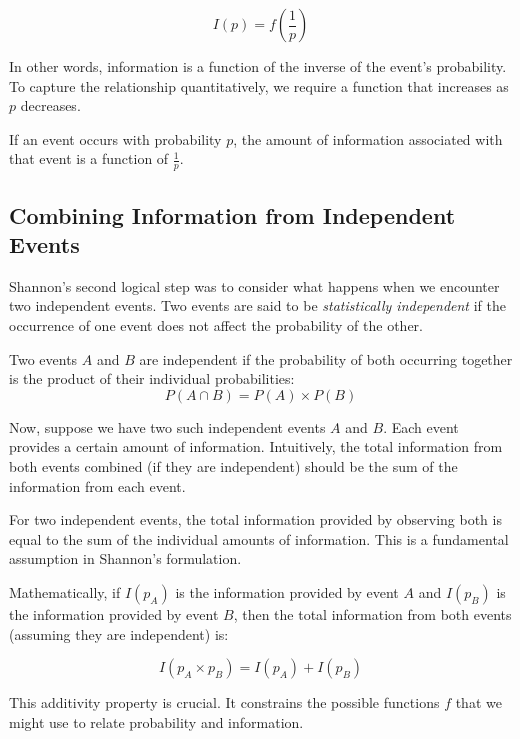 \documentclass[12pt,a4paper]{article}
\newenvironment{defbox}[1][]{%
  \begin{tcolorbox}[enhanced, breakable, colback=defcolor, colframe=green!50!black, title=#1, fonttitle=\bfseries, arc=3pt, boxrule=0.5pt]
}{\end{tcolorbox}}
\newenvironment{rembox}[1][]{%
  \begin{tcolorbox}[enhanced, breakable, colback=gray!5, colframe=gray!50, title=#1, fonttitle=\bfseries, arc=3pt, boxrule=0.5pt]
}{\end{tcolorbox}}
\begin{document}
\[
I(p) = f\left(\frac{1}{p}\right)
\]

In other words, information is a function of the inverse of the event’s probability. To capture the relationship quantitatively, we require a function that increases as $p$ decreases.

\begin{defbox}[Information Content]
If an event occurs with probability $p$, the amount of information associated with that event is a function of $\frac{1}{p}$.
\end{defbox}

\subsection{Combining Information from Independent Events}
Shannon’s second logical step was to consider what happens when we encounter two independent events. Two events are said to be \textit{statistically independent} if the occurrence of one event does not affect the probability of the other.

\begin{defbox}[Statistical Independence]
Two events $A$ and $B$ are independent if the probability of both occurring together is the product of their individual probabilities: 
\[
P(A \cap B) = P(A) \times P(B)
\]
\end{defbox}

Now, suppose we have two such independent events $A$ and $B$. Each event provides a certain amount of information. Intuitively, the total information from both events combined (if they are independent) should be the sum of the information from each event.

\begin{rembox}[Additivity of Information]
For two independent events, the total information provided by observing both is equal to the sum of the individual amounts of information. This is a fundamental assumption in Shannon’s formulation.
\end{rembox}

Mathematically, if $I(p_A)$ is the information provided by event $A$ and $I(p_B)$ is the information provided by event $B$, then the total information from both events (assuming they are independent) is:

\[
I(p_A \times p_B) = I(p_A) + I(p_B)
\]

This additivity property is crucial. It constrains the possible functions $f$ that we might use to relate probability and information.
\end{document}
